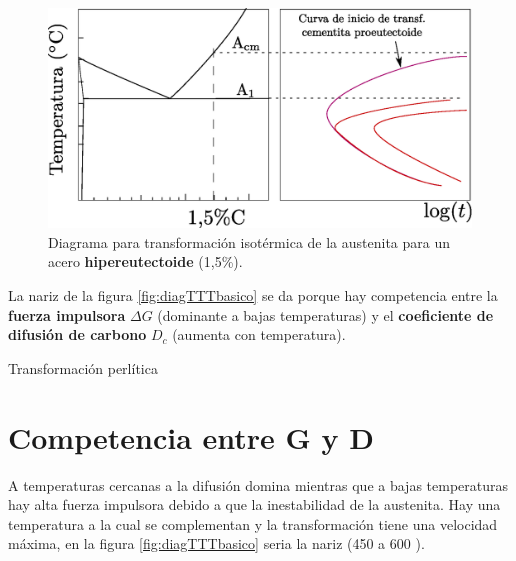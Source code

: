 \begin{figure}[htb!]
    \centering
    \includegraphics[width=\textwidth]{fig/diagTTThiper.eps}
    \caption{Diagrama para transformación isotérmica de la austenita para un acero \textbf{hipereutectoide} (1,5\%).}
    \label{fig:diagTTThiper}
\end{figure}

La nariz de la figura \ref{fig:diagTTTbasico} se da porque hay competencia entre la \textbf{fuerza impulsora} $\Delta G$ (dominante a bajas temperaturas) y el \textbf{coeficiente de difusión de carbono} $D_c$ (aumenta con temperatura).

Transformación perlítica



\section{Competencia entre G y D}
A temperaturas cercanas a \Aone la difusión domina mientras que a bajas temperaturas hay alta fuerza impulsora debido a que la inestabilidad de la austenita. Hay una temperatura a la cual se complementan y la transformación tiene una velocidad máxima, en la figura \ref{fig:diagTTTbasico} seria la nariz (450 a 600 \grad).

